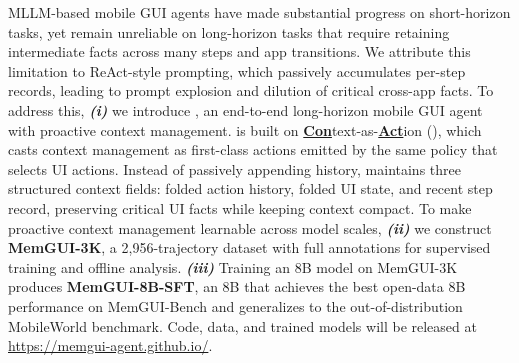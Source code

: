 MLLM-based mobile GUI agents have made substantial progress on short-horizon tasks, yet remain unreliable on long-horizon tasks that require retaining intermediate facts across many steps and app transitions. We attribute this limitation to ReAct-style prompting, which passively accumulates per-step records, leading to prompt explosion and dilution of critical cross-app facts.
To address this, \textbf{\emph{(i)}} we introduce \textbf{\ourmethod}, an end-to-end long-horizon mobile GUI agent with proactive context management. \ourmethod is built on \textbf{\underline{Con}}text-as-\textbf{\underline{Act}}ion (\textbf{\conact}), which casts context management as first-class actions emitted by the same policy that selects UI actions. Instead of passively appending history, \conact maintains three structured context fields: folded action history, folded UI state, and recent step record, preserving critical UI facts while keeping context compact.
To make proactive context management learnable across model scales, \textbf{\emph{(ii)}} we construct \textbf{MemGUI-3K}, a 2{,}956-trajectory dataset with full \conact annotations for supervised training and offline analysis. \textbf{\emph{(iii)}} Training an 8B model on MemGUI-3K produces \textbf{MemGUI-8B-SFT}, an 8B \ourmethod that achieves the best open-data 8B performance on MemGUI-Bench and generalizes to the out-of-distribution MobileWorld benchmark. Code, data, and trained models will be released at \url{https://memgui-agent.github.io/}.
